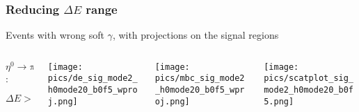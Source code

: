 \documentclass[10 pt,compress,mathserif]{beamer}
\newcommand{\etappp}{\ensuremath{\eta^0\to \pi^+\pi^-\pi^0}\xspace}
\begin{document}
\begin{frame}
 \frametitle{Reducing $\Delta E$ range}
 \begin{small}
 \begin{itemize}
  {\item Events with wrong soft $\gamma$, with projections on the signal regions}
 \end{itemize}
  \begin{columns}
  \begin{column}{0.2\textwidth}
   $\etappp$:\\
   \begin{tiny}
   $\Delta E>-0.30\ \text{GeV}$
   \end{tiny}
  \end{column}
  \begin{column}{0.25\textwidth}
   \begin{center}
    {\texttt{[image: pics/de\_sig\_mode2\_h0mode20\_b0f5\_wproj.png]}}
   \end{center}
  \end{column}
  \begin{column}{0.25\textwidth}
   \begin{center}
    {\texttt{[image: pics/mbc\_sig\_mode2\_h0mode20\_b0f5\_wproj.png]}}
   \end{center}
  \end{column}
  \begin{column}{0.3\textwidth}
   \begin{center}
    {\texttt{[image: pics/scatplot\_sig\_mode2\_h0mode20\_b0f5.png]}}
   \end{center}
   \end{column}
  \end{columns}


\end{small}
\end{frame}
\end{document}
